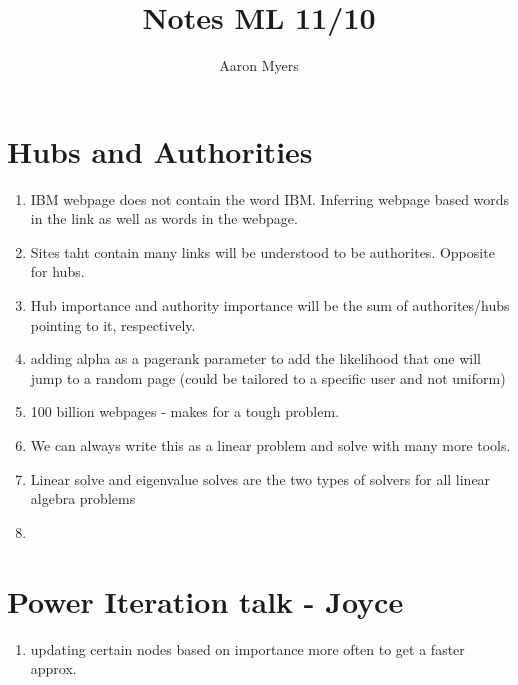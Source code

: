 \documentclass[a4paper,10pt]{article}
\title{Notes ML 11/10}
\author{Aaron Myers}
\begin{document}
\maketitle
\pagebreak
\section{Hubs and Authorities}
\begin{enumerate}
	\item IBM webpage does not contain the word IBM. Inferring webpage based words in the link as well as words in the webpage.
	\item Sites taht contain many links will be understood to be authorites. Opposite for hubs.
	\item Hub importance and authority importance will be the sum of authorites/hubs pointing to it, respectively.
	\item adding alpha as a pagerank parameter to add the likelihood that one will jump to a random page (could be tailored to a specific user and not uniform)
	\item 100 billion webpages - makes for a tough problem.
	\item We can always write this as a linear problem and solve with many more tools.
	\item Linear solve and eigenvalue solves are the two types of solvers for all linear algebra problems
	\item     	
\end{enumerate}

\section{Power Iteration talk - Joyce}
\begin{enumerate}
	\item updating certain nodes based on importance more often to get a faster approx. 
\end{enumerate}
\end{document}
